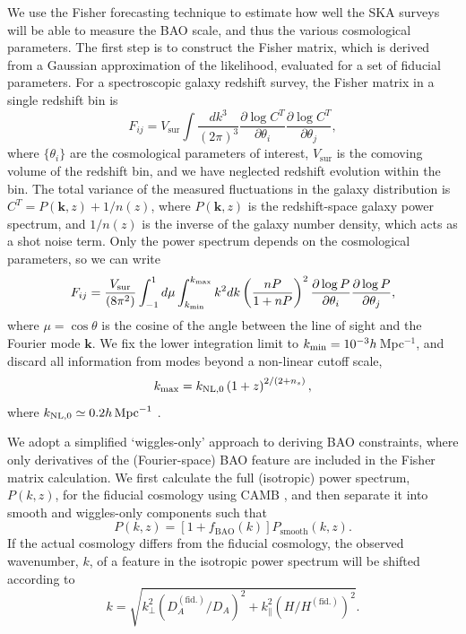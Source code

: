 \documentclass[useAMS,usenatbib]{mn2e}
\newcommand{\corr}{\color{blue}} %
\newcommand{\be}{\begin{equation}}
\newcommand{\ee}{\end{equation}}
\newcommand{\bea}{\begin{eqnarray}}
\newcommand{\eea}{\end{eqnarray}}
\begin{document}
We use the Fisher forecasting technique to estimate how well the SKA surveys will be able to measure the BAO scale, and thus the various cosmological parameters. The first step is to construct the Fisher matrix, which is derived from a Gaussian approximation of the likelihood, evaluated for a set of fiducial parameters. For a spectroscopic galaxy redshift survey, the Fisher matrix in a single redshift bin is
\be
F_{ij} = V_\mathrm{sur} \int \frac{dk^3}{(2\pi)^3} \frac{\partial \log C^T}{\partial \theta_i} \frac{\partial \log C^T}{\partial \theta_j},
\ee
where $\{\theta_i\}$ are the cosmological parameters of interest, $V_\mathrm{sur}$
is the comoving volume of the redshift bin, and we have neglected redshift evolution within the bin. The total variance of the measured fluctuations in the galaxy distribution is $C^T = P(\mathbf{k}, z) + 1/n(z)$, where $P(\mathbf{k}, z)$ is the redshift-space galaxy power spectrum, and $1/n(z)$ is the inverse of the galaxy number density, which acts as a shot noise term. Only the power spectrum depends on the cosmological parameters, so we can write
\bea
F_{ij} = \frac{V_{\rm sur}}{(8 \pi^2)}
\int_{-1}^{1}d\mu \int_{k_{\rm min}}^{{k_{\rm max}}} k^2 dk \left(\frac{nP}{1+nP}\right)^2 \frac{\partial \log P}{\partial \theta_i} \frac{\partial \log P}{\partial \theta_j}, \nonumber
\eea
where $\mu = \cos \theta$ is the cosine of the angle between the line of sight and the Fourier mode $\mathbf{k}$. We fix the lower integration limit to $k_{\rm min} = 10^{-3}h\,$Mpc$^{-1}$, and discard all information from modes beyond a non-linear cutoff scale,
\begin{equation}
k_{\rm max} = k_{\rm NL, 0} \left( 1+z \right)^{2/(2+n_s)},
\end{equation}
where $k_{\rm NL, 0} \simeq 0.2 h\,{\rm Mpc}^{-1}$ \citep{Smith:2002dz}.

We adopt a simplified `wiggles-only' approach to deriving BAO constraints, where only derivatives of the (Fourier-space) BAO feature are included in the Fisher matrix calculation. We first calculate the full (isotropic) power spectrum, $P(k, z)$, for the fiducial cosmology using CAMB {\corr \citep{Lewis:1999bs}}, and then separate it into smooth and wiggles-only components such that \citep{Bull:2014rha}
\begin{equation}\label{fbao_of_k}
P(k, z) = \left [ 1 + f_\mathrm{BAO}(k) \right ] P_\mathrm{smooth}(k, z).
\end{equation}
If the actual cosmology differs from the fiducial cosmology, the observed wavenumber, $k$, of a feature in the isotropic power spectrum will be shifted according to \citep{Blake:2003rh}
\be
k = \sqrt{k^2_\perp ( D_A^\mathrm{(fid.)} / D_A )^2 + k^2_\parallel ( H / H^\mathrm{(fid.)} )^2}.
\ee
\end{document}
